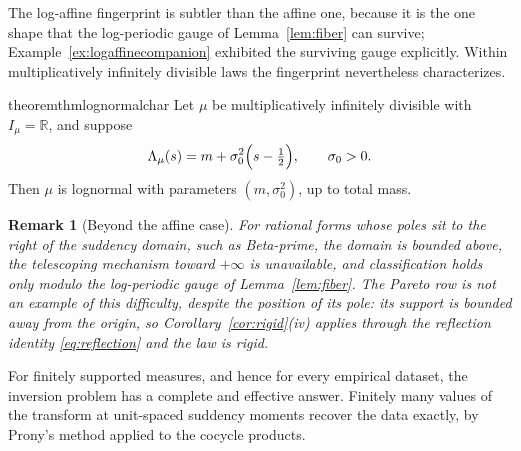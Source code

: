 \documentclass[sn-mathphys-num]{sn-jnl}
\theoremstyle{thmstyleone}%
\theoremstyle{thmstyletwo}%
\newtheorem{remark}{Remark}%
\theoremstyle{thmstylethree}%
\theoremstyle{thmstyleone}%
\providecommand{\R}{\mathbb{R}}
\begin{document}
	The log-affine fingerprint is subtler than the affine one, because
	it is the one shape that the log-periodic gauge of
	Lemma~\ref{lem:fiber} can survive; Example~\ref{ex:logaffinecompanion}
	exhibited the surviving gauge explicitly. Within multiplicatively
	infinitely divisible laws the fingerprint nevertheless characterizes.
	
	\begin{restatable}{theorem}{thmlognormalchar}\label{thm:lognormalchar}
		Let $\mu$ be multiplicatively infinitely divisible with
		$I_\mu=\R$, and suppose
		\begin{equation}\label{eq:lognormalhyp}
			\Lambda_\mu(s)=m+\sigma_0^2\Bigl(s-\tfrac12\Bigr),
			\qquad\sigma_0>0 .
		\end{equation}
		Then $\mu$ is lognormal with parameters $(m,\sigma_0^2)$, up to
		total mass.
	\end{restatable}
	
	\begin{remark}[Beyond the affine case]\label{rem:meijer}
		For rational forms whose poles sit to
		the \emph{right} of the suddency domain, such as Beta-prime, the
		domain is bounded above, the telescoping mechanism toward
		$+\infty$ is unavailable, and classification holds only modulo the
		log-periodic gauge of Lemma~\ref{lem:fiber}. The Pareto row is not
		an example of this difficulty, despite the position of its pole:
		its support is bounded away from the origin, so
		Corollary~\ref{cor:rigid}(iv) applies through the reflection
		identity \eqref{eq:reflection} and the law is rigid.
	\end{remark}
	
	For finitely supported measures, and hence for every empirical
	dataset, the inversion problem has a complete and effective answer.
	Finitely many values of the transform at unit-spaced suddency moments
	recover the data exactly, by Prony's method applied to the cocycle
	products.
	
\end{document}

